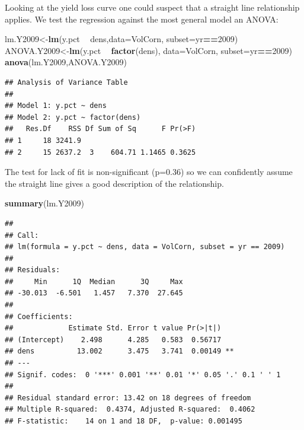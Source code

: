 \documentclass[letterpaper,]{book}
\newenvironment{Shaded}{\begin{snugshade}}{\end{snugshade}}
\newcommand{\DataTypeTok}[1]{\textcolor[rgb]{0.13,0.29,0.53}{#1}}
\newcommand{\DecValTok}[1]{\textcolor[rgb]{0.00,0.00,0.81}{#1}}
\newcommand{\KeywordTok}[1]{\textcolor[rgb]{0.13,0.29,0.53}{\textbf{#1}}}
\newcommand{\NormalTok}[1]{#1}
\newcommand{\OperatorTok}[1]{\textcolor[rgb]{0.81,0.36,0.00}{\textbf{#1}}}
\newcommand{\StringTok}[1]{\textcolor[rgb]{0.31,0.60,0.02}{#1}}
\begin{document}
Looking at the yield loss curve one could suspect that a straight line relationship applies. We test the regression against the most general model an ANOVA:

\begin{Shaded}
\begin{Highlighting}[]
\NormalTok{lm.Y2009<-}\KeywordTok{lm}\NormalTok{(y.pct }\OperatorTok{~}\StringTok{ }\NormalTok{dens,}\DataTypeTok{data=}\NormalTok{VolCorn, }\DataTypeTok{subset=}\NormalTok{yr}\OperatorTok{==}\DecValTok{2009}\NormalTok{)}
\NormalTok{ANOVA.Y2009<-}\KeywordTok{lm}\NormalTok{(y.pct }\OperatorTok{~}\StringTok{ }\KeywordTok{factor}\NormalTok{(dens), }\DataTypeTok{data=}\NormalTok{VolCorn, }\DataTypeTok{subset=}\NormalTok{yr}\OperatorTok{==}\DecValTok{2009}\NormalTok{)}
\KeywordTok{anova}\NormalTok{(lm.Y2009,ANOVA.Y2009)}
\end{Highlighting}
\end{Shaded}

\begin{verbatim}
## Analysis of Variance Table
## 
## Model 1: y.pct ~ dens
## Model 2: y.pct ~ factor(dens)
##   Res.Df    RSS Df Sum of Sq      F Pr(>F)
## 1     18 3241.9                           
## 2     15 2637.2  3    604.71 1.1465 0.3625
\end{verbatim}

The test for lack of fit is non-significant (p=0.36) so we can confidently assume the straight line gives a good description of the relationship.

\begin{Shaded}
\begin{Highlighting}[]
\KeywordTok{summary}\NormalTok{(lm.Y2009)}
\end{Highlighting}
\end{Shaded}

\begin{verbatim}
## 
## Call:
## lm(formula = y.pct ~ dens, data = VolCorn, subset = yr == 2009)
## 
## Residuals:
##     Min      1Q  Median      3Q     Max 
## -30.013  -6.501   1.457   7.370  27.645 
## 
## Coefficients:
##             Estimate Std. Error t value Pr(>|t|)   
## (Intercept)    2.498      4.285   0.583  0.56717   
## dens          13.002      3.475   3.741  0.00149 **
## ---
## Signif. codes:  0 '***' 0.001 '**' 0.01 '*' 0.05 '.' 0.1 ' ' 1
## 
## Residual standard error: 13.42 on 18 degrees of freedom
## Multiple R-squared:  0.4374, Adjusted R-squared:  0.4062 
## F-statistic:    14 on 1 and 18 DF,  p-value: 0.001495
\end{verbatim}
\end{document}
